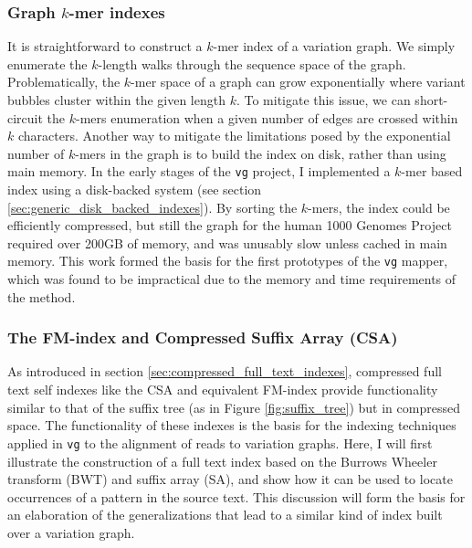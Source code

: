 \subsubsection{Graph $k$-mer indexes}

It is straightforward to construct a $k$-mer index of a variation graph.
We simply enumerate the $k$-length walks through the sequence space of the graph.
Problematically, the $k$-mer space of a graph can grow exponentially where variant bubbles cluster within the given length $k$.
To mitigate this issue, we can short-circuit the $k$-mers enumeration when a given number of edges are crossed within $k$ characters.
Another way to mitigate the limitations posed by the exponential number of $k$-mers in the graph is to build the index on disk, rather than using main memory.
In the early stages of the {\tt vg} project, I implemented a $k$-mer based index using a disk-backed system (see section \ref{sec:generic_disk_backed_indexes}).
By sorting the $k$-mers, the index could be efficiently compressed, but still the graph for the human 1000 Genomes Project required over 200GB of memory, and was unusably slow unless cached in main memory.
This work formed the basis for the first prototypes of the {\tt vg} mapper, which was found to be impractical due to the memory and time requirements of the method.

\subsubsection{The FM-index and Compressed Suffix Array (CSA)}
\label{sec:fmidx_csa}

As introduced in section \ref{sec:compressed_full_text_indexes}, compressed full text self indexes like the CSA and equivalent FM-index provide functionality similar to that of the suffix tree (as in Figure \ref{fig:suffix_tree}) but in compressed space.
The functionality of these indexes is the basis for the indexing techniques applied in {\tt vg} to the alignment of reads to variation graphs.
Here, I will first illustrate the construction of a full text index based on the Burrows Wheeler transform (BWT) and suffix array (SA), and show how it can be used to locate occurrences of a pattern in the source text.
This discussion will form the basis for an elaboration of the generalizations that lead to a similar kind of index built over a variation graph.

